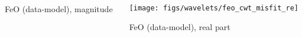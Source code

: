 \begin{frame}
{{\begin{columns}
\begin{column}[T]{60mm}
    \hspace{5mm} FeO (data-model), magnitude
  \end{column}
  \begin{column}[T]{60mm}
    \texttt{[image: figs/wavelets/feo\_cwt\_misfit\_re]}

    \hspace{5mm} FeO (data-model), real part

  \end{column}
\end{columns}

}}
















\end{frame}
